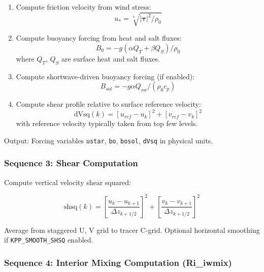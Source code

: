 \documentclass[11pt, a4paper]{article}
\begin{document}
\begin{enumerate}
    \item Compute friction velocity from wind stress:
    \begin{equation}
    u_* = \sqrt[4]{|\boldsymbol{\tau}|^2/\rho_0}
    \end{equation}
    
    \item Compute buoyancy forcing from heat and salt fluxes:
    \begin{equation}
    B_0 = -g(\alpha Q_T + \beta Q_S)/\rho_0
    \end{equation}
    where $Q_T$, $Q_S$ are surface heat and salt fluxes.
    
    \item Compute shortwave-driven buoyancy forcing (if enabled):
    \begin{equation}
    B_{sol} = -g \alpha Q_{sw}/(\rho_0 c_p)
    \end{equation}
    
    \item Compute shear profile relative to surface reference velocity:
    \begin{equation}
    \text{dVsq}(k) = [u_{ref}-u_k]^2 + [v_{ref}-v_k]^2
    \end{equation}
    with reference velocity typically taken from top few levels.
\end{enumerate}

Output: Forcing variables \texttt{ustar}, \texttt{bo}, \texttt{bosol}, \texttt{dVsq} in physical units.

\subsubsection{Sequence 3: Shear Computation}

Compute vertical velocity shear squared:

\begin{equation}
\text{shsq}(k) = \left[\frac{u_k - u_{k+1}}{\Delta z_{k+1/2}}\right]^2 + \left[\frac{v_k - v_{k+1}}{\Delta z_{k+1/2}}\right]^2
\end{equation}

Average from staggered U, V grid to tracer C-grid. Optional horizontal smoothing if \texttt{KPP\_SMOOTH\_SHSQ} enabled.

\subsubsection{Sequence 4: Interior Mixing Computation (Ri\_iwmix)}
\end{document}
